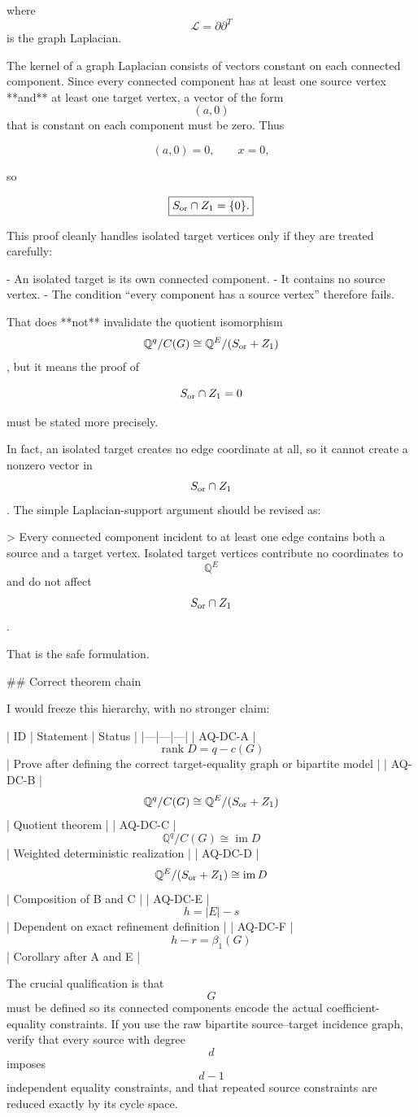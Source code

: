 where $$\mathcal L=\partial\partial^T$$ is the graph Laplacian.

The kernel of a graph Laplacian consists of vectors constant on each connected component. Since every connected component has at least one source vertex **and** at least one target vertex, a vector of the form $$(a,0)$$ that is constant on each component must be zero. Thus

$$
(a,0)=0,
\qquad
x=0,
$$

so

$$
\boxed{
S_{\rm or}\cap Z_1=\{0\}.
}
$$

This proof cleanly handles isolated target vertices only if they are treated carefully:

- An isolated target is its own connected component.
- It contains no source vertex.
- The condition “every component has a source vertex” therefore fails.

That does **not** invalidate the quotient isomorphism $$\mathbb Q^q/C(G)\cong \mathbb Q^E/(S_{\rm or}+Z_1)$$, but it means the proof of

$$
S_{\rm or}\cap Z_1=0
$$

must be stated more precisely.

In fact, an isolated target creates no edge coordinate at all, so it cannot create a nonzero vector in $$S_{\rm or}\cap Z_1$$. The simple Laplacian-support argument should be revised as:

> Every connected component incident to at least one edge contains both a source and a target vertex. Isolated target vertices contribute no coordinates to $$\mathbb Q^E$$ and do not affect $$S_{\rm or}\cap Z_1$$.

That is the safe formulation.

## Correct theorem chain

I would freeze this hierarchy, with no stronger claim:

| ID | Statement | Status |
|---|---|---|
| AQ-DC-A | $$\operatorname{rank}D=q-c(G)$$ | Prove after defining the correct target-equality graph or bipartite model |
| AQ-DC-B | $$\mathbb Q^q/C(G)\cong\mathbb Q^E/(S_{\rm or}+Z_1)$$ | Quotient theorem |
| AQ-DC-C | $$\mathbb Q^q/C(G)\cong\operatorname{im}D$$ | Weighted deterministic realization |
| AQ-DC-D | $$\mathbb Q^E/(S_{\rm or}+Z_1)\cong\operatorname{im}D$$ | Composition of B and C |
| AQ-DC-E | $$h=|E|-s$$ | Dependent on exact refinement definition |
| AQ-DC-F | $$h-r=\beta_1(G)$$ | Corollary after A and E |

The crucial qualification is that $$G$$ must be defined so its connected components encode the actual coefficient-equality constraints. If you use the raw bipartite source–target incidence graph, verify that every source with degree $$d$$ imposes $$d-1$$ independent equality constraints, and that repeated source constraints are reduced exactly by its cycle space.

